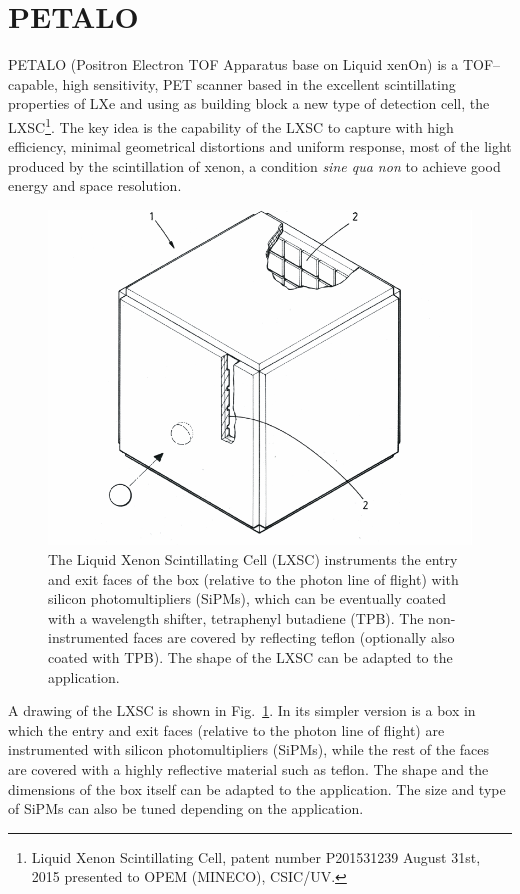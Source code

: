 \documentclass[review]{elsarticle}
\begin{document}
\section{PETALO}

PETALO (Positron Electron TOF Apparatus base on Liquid xenOn) is a TOF--capable, high sensitivity, PET scanner based in the excellent scintillating properties of LXe and using as building block a new type of detection cell,  the LXSC\footnote{Liquid Xenon Scintillating Cell, patent number P201531239 August 31st, 2015 presented to OPEM (MINECO), CSIC/UV.}. The key idea is the capability of the LXSC to capture with high efficiency, minimal geometrical distortions and uniform response, most of the light produced by the scintillation of xenon, a condition \emph{sine qua non} to achieve good energy and space resolution. 

\begin{figure}[!htbp]
	\centering
	\includegraphics[scale=0.6]{../img/LXSC2.pdf}
	\caption{\label{fig.box} The Liquid Xenon Scintillating Cell (LXSC) instruments the entry and exit faces of the box (relative to the photon line of flight) with silicon photomultipliers (SiPMs), which can be eventually coated with a wavelength shifter, tetraphenyl butadiene (TPB). The non-instrumented faces are covered by reflecting teflon (optionally also coated with TPB). The shape of the LXSC can be adapted to the application. }
\end{figure}

A drawing of the LXSC is shown in Fig.~\ref{fig.box}. In its simpler version is a box in which 
the entry and exit faces (relative to the photon line of flight) are instrumented with silicon photomultipliers (SiPMs), while the rest of the faces are covered with a highly reflective material such as teflon. The shape and the dimensions of the box itself can be adapted to the application. The size and type of SiPMs can also be tuned depending on the application.
\end{document}

